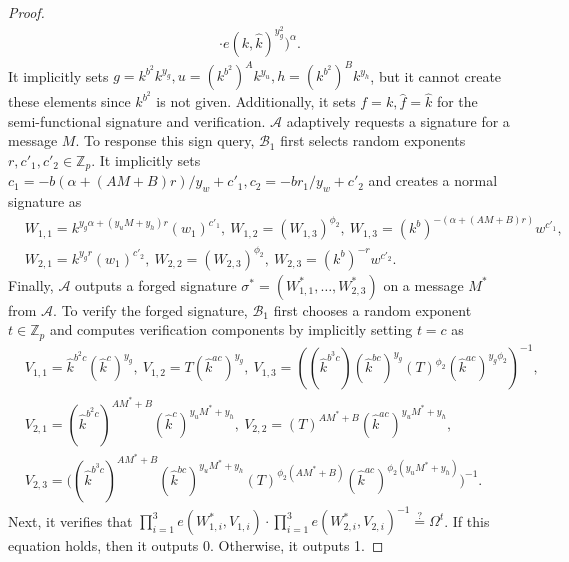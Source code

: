 \documentclass[11pt,letterpaper]{article}
\newcommand{\Z}{\mathbb{Z}}
\newcommand{\mc}[1]{\mathcal{#1}}
\begin{document}
\begin{proof}
\begin{align*}
            \cdot e(k, \hat{k})^{y_g^2})^{\alpha}.
    \end{align*}
It implicitly sets $g = k^{b^2} k^{y_g}, u = (k^{b^2})^A k^{y_u}, h =
(k^{b^2})^B k^{y_h}$, but it cannot create these elements since $k^{b^2}$ is
not given. Additionally, it sets $f = k, \hat{f} = \hat{k}$ for the
semi-functional signature and verification.
$\mc{A}$ adaptively requests a signature for a message $M$. To response this
sign query, $\mc{B}_1$ first selects random exponents $r, c'_1, c'_2 \in
\Z_p$. It implicitly sets
    $c_1 = -b (\alpha + (A M + B) r) / y_w + c'_1,
    c_2 = -b r_1 / y_w + c'_2$
and creates a normal signature as
    \begin{align*}
    &   W_{1,1} = k^{y_g \alpha + (y_u M + y_h)r} (w_1)^{c'_1},~
        W_{1,2} = (W_{1,3})^{\phi_2},~
        W_{1,3} = (k^b)^{-(\alpha + (A M + B)r)} w^{c'_1},~ \\
    &   W_{2,1} = k^{y_g r} (w_1)^{c'_2},~
        W_{2,2} = (W_{2,3})^{\phi_2},~
        W_{2,3} = (k^b)^{-r} w^{c'_2}.
    \end{align*}
Finally, $\mc{A}$ outputs a forged signature $\sigma^* = (W_{1,1}^*, \ldots,
W_{2,3}^*)$ on a message $M^*$ from $\mc{A}$. To verify the forged signature,
$\mc{B}_1$ first chooses a random exponent $t \in \Z_p$ and computes
verification components by implicitly setting $t = c$ as
    \begin{align*}
    &   V_{1,1} = \hat{k}^{b^2 c} (\hat{k}^c)^{y_g},~
        V_{1,2} = T (\hat{k}^{ac})^{y_g},~
        V_{1,3} = ((\hat{k}^{b^3 c}) (\hat{k}^{bc})^{y_g} (T)^{\phi_2}
                  (\hat{k}^{ac})^{y_g \phi_2})^{-1}, \\
    &   V_{2,1} = (\hat{k}^{b^2 c})^{A M^* + B} (\hat{k}^c)^{y_u M^* + y_h},~
        V_{2,2} = (T)^{A M^* + B} (\hat{k}^{ac})^{y_u M^* + y_h},~ \\
    &   V_{2,3} = \big(
                  (\hat{k}^{b^3 c})^{A M^* + B} (\hat{k}^{bc})^{y_u M^* + y_h}
                  (T)^{\phi_2 (A M^* + B)} (\hat{k}^{ac})^{\phi_2 (y_u M^* + y_h)}
                  \big)^{-1}.
    \end{align*}
Next, it verifies that
    $\prod_{i=1}^3 e(W_{1,i}^*, V_{1,i}) \cdot
    \prod_{i=1}^3  e(W_{2,i}^*, V_{2,i})^{-1} \stackrel{?}{=} \Omega^t$.
If this equation holds, then it outputs 0. Otherwise, it outputs 1.


\end{proof}
\end{document}
